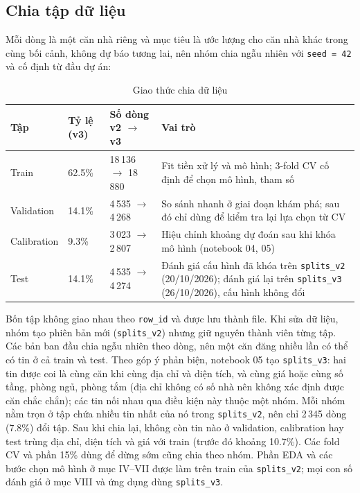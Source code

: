 \documentclass[11pt]{article}
\begin{document}
\subsection{Chia tập dữ liệu}

Mỗi dòng là một căn nhà riêng và mục tiêu là ước lượng cho căn nhà khác trong cùng bối cảnh, không dự báo
tương lai, nên nhóm chia ngẫu nhiên với \texttt{seed = 42} và cố định từ đầu dự án:

\begin{table}[H]
\centering
\small
\caption{Giao thức chia dữ liệu}
\begin{tabular}{@{}L{0.18\textwidth}L{0.10\textwidth}L{0.10\textwidth}L{0.52\textwidth}@{}}
\toprule
\textbf{Tập} & \textbf{Tỷ lệ (v3)} & \textbf{Số dòng v2 $\rightarrow$ v3} & \textbf{Vai trò} \\
\midrule
Train & 62.5\% & 18\,136 $\rightarrow$ 18\,880 & Fit tiền xử lý và mô hình; 3-fold CV cố định để chọn mô hình, tham số \\
Validation & 14.1\% & 4\,535 $\rightarrow$ 4\,268 & So sánh nhanh ở giai đoạn khám phá; sau đó chỉ dùng để kiểm tra lại lựa chọn từ CV \\
Calibration & 9.3\% & 3\,023 $\rightarrow$ 2\,807 & Hiệu chỉnh khoảng dự đoán sau khi khóa mô hình (notebook 04, 05) \\
Test & 14.1\% & 4\,535 $\rightarrow$ 4\,274 & Đánh giá cấu hình đã khóa trên \texttt{splits\_v2} (20/10/2026); đánh giá lại trên \texttt{splits\_v3} (26/10/2026), cấu hình không đổi \\
\bottomrule
\end{tabular}
\end{table}

Bốn tập không giao nhau theo \texttt{row\_id} và được lưu thành file. Khi sửa dữ liệu, nhóm tạo phiên bản mới
(\texttt{splits\_v2}) nhưng giữ nguyên thành viên từng tập. Các bản ban đầu chia ngẫu nhiên theo dòng, nên một căn
đăng nhiều lần có thể có tin ở cả train và test. Theo góp ý phản biện, notebook 05 tạo \texttt{splits\_v3}: hai tin
được coi là cùng căn khi cùng địa chỉ và diện tích, và cùng giá hoặc cùng số tầng, phòng ngủ, phòng tắm (địa chỉ
không có số nhà nên không xác định được căn chắc chắn); các tin nối nhau qua điều kiện này thuộc một nhóm. Mỗi nhóm
nằm trọn ở tập chứa nhiều tin nhất của nó trong \texttt{splits\_v2}, nên chỉ 2\,345 dòng (7.8\%) đổi tập. Sau khi chia
lại, không còn tin nào ở validation, calibration hay test trùng địa chỉ, diện tích và giá với train (trước đó khoảng
10.7\%). Các fold CV và phần 15\% dùng để dừng sớm cũng chia theo nhóm. Phần EDA và các bước chọn mô hình ở mục IV--VII
được làm trên train của \texttt{splits\_v2}; mọi con số đánh giá ở mục VIII và ứng dụng dùng \texttt{splits\_v3}.
\end{document}
